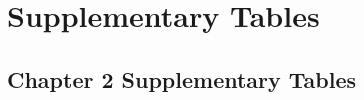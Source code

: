 \chapter{Supplementary Tables}
\chaptables{}

\section*{Chapter 2 Supplementary Tables}
\setcounter{table}{0}
\renewcommand\thetable{S2.\arabic{table}}



\clearpage{}